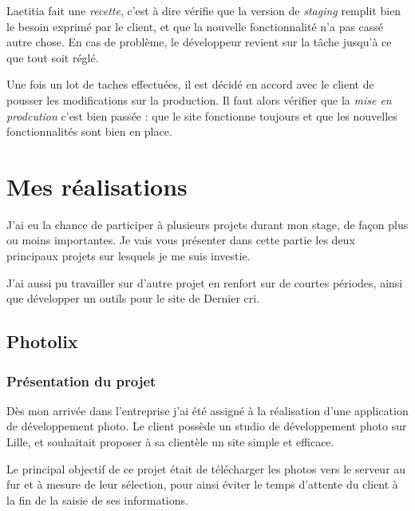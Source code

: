 \bigskip

Laetitia fait une \emph{recette}, c'est à dire vérifie que la version de
\emph{staging} remplit bien le besoin exprimé par le client, et que la
nouvelle fonctionnalité n'a pas cassé autre chose. En cas de problème,
le développeur revient sur la tâche jusqu'à ce que tout soit réglé.

\bigskip

Une fois un lot de taches effectuées, il est décidé en accord avec le
client de pousser les modifications sur la production. Il faut alors
vérifier que la \emph{mise en prodcution} c'est bien passée : que le
site fonctionne toujours et que les nouvelles fonctionnalités sont bien
en place.

\newpage

\section{Mes réalisations}\label{mes-ruxe9alisations}

\bigskip

J'ai eu la chance de participer à plusieurs projets durant mon stage, de
façon plus ou moins importantes. Je vais vous présenter dans cette
partie les deux principaux projets sur lesquels je me suis investie.

\bigskip

J'ai aussi pu travailler sur d'autre projet en renfort sur de courtes
périodes, ainsi que développer un outils pour le site de Dernier cri.

\bigskip

\subsection{Photolix}\label{photolix}

\subsubsection{Présentation du projet}\label{pruxe9sentation-du-projet}

\bigskip

Dès mon arrivée dans l'entreprise j'ai été assigné à la réalisation
d'une application de développement photo. Le client possède un studio de
développement photo sur Lille, et souhaitait proposer à sa clientèle un
site simple et efficace.

\bigskip

Le principal objectif de ce projet était de télécharger les photos vers
le serveur au fur et à mesure de leur sélection, pour ainsi éviter le
temps d'attente du client à la fin de la saisie de ses informations.

